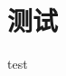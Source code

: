 \documentclass[library = {master}, type = electronic]{whuthesis}
\begin{document}
\tableofcontents

\chapter{测试}
test
\end{document}
